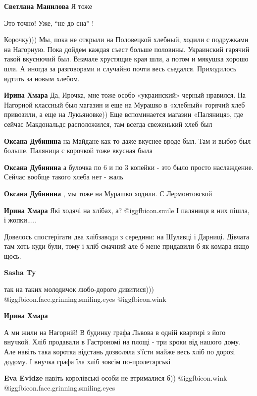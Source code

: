 \begin{itemize}
\begin{itemize}
\textbf{Светлана Манилова} Я тоже

Это точно! Уже, \enquote{не до сна} !
\end{itemize} %


Корочку))) Мы, пока не открыли на Половецкой хлебный, ходили с подружками на
Нагорную. Пока дойдем каждая съест больше половины. Украинский гарячий такой
вкуснючий был. Вначале хрустящие края шли, а потом и мякушка хорошо шла. А
иногда за разговорами и случайно почти весь сьедался. Приходилось идтить за
новым хлебом.

\begin{itemize} %
\textbf{Ирина Хмара}
Да, Ирочка, мне тоже особо «украинский» черный нравился.
На Нагорной классный был магазин и еще на Мурашко в «хлебный» горячий хлеб привозили, а еще на Лукьяновке))
Еще вспоминается магазин «Паляниця», где сейчас Макдональдс расположился, там всегда свеженький хлеб был

\textbf{Оксана Дубинина} на Майдане как-то даже вкуснее вроде был. Там и выбор был больше. Паляница с корочкой тоже вкусная была

\textbf{Оксана Дубинина} а булочка по 6 и по 3 копейки - это было просто наслаждение. Сейчас вообще такого хлеба нет - жаль

\textbf{Оксана Дубинина} , мы тоже на Мурашко ходили. С Лермонтовской

\textbf{Ирина Хмара}
Які ходячі на хлібах, а?  @igg{fbicon.smile} 
І паляниця в них пішла, і жопки..... 

Довелось спостерігати два хлібзаводи з середини: на Шулявці і Дарниці.  Дівчата
там хоть куди були, тому і хліб смачний але б мене придавили б як комара якщо
щось.

\textbf{Sasha Ty} 

так на таких молодичок любо-дорого дивитися)))
@igg{fbicon.face.grinning.smiling.eyes}  @igg{fbicon.wink} 

\textbf{Ирина Хмара} 

А ми жили на Нагорній! В будинку графа Львова в одній квартирі з його внучкой.
Хліб продавали в Гастрономі на площі - три кроки від нашого дому. Але навіть
така коротка відстань дозволяла з'їсти майже весь хліб по дорозі додому. І
внучка графа їла хліб зовсім по-пролетарські

\textbf{Eva Evidze} навіть королівські особи не втрималися б)) @igg{fbicon.wink}  @igg{fbicon.face.grinning.smiling.eyes} 
\end{itemize} %


\end{itemize}
